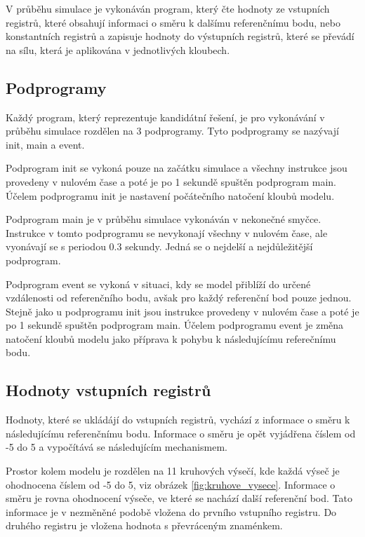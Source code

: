 V průběhu simulace je vykonáván program, který čte hodnoty ze vstupních registrů, které obsahují informaci o směru k dalšímu referenčnímu bodu, nebo konstantních registrů a zapisuje hodnoty do výstupních registrů, které se převádí na sílu, která je aplikována v jednotlivých kloubech.

\subsection{Podprogramy}
Každý program, který reprezentuje kandidátní řešení, je pro vykonávání v průběhu simulace rozdělen na 3 podprogramy.
Tyto podprogramy se nazývají init, main a event.

Podprogram init se vykoná pouze na začátku simulace a všechny instrukce jsou provedeny v nulovém čase a poté je po 1 sekundě spuštěn podprogram main.
Účelem podprogramu init je nastavení počátečního natočení kloubů modelu.

Podprogram main je v průběhu simulace vykonáván v nekonečné smyčce.
Instrukce v tomto podprogramu se nevykonají všechny v nulovém čase, ale vyonávají se s periodou 0.3 sekundy.
Jedná se o nejdelší a nejdůležitější podprogram.

Podprogram event se vykoná v situaci, kdy se model přiblíží do určené vzdálenosti od referenčního bodu, avšak pro každý referenční bod pouze jednou.
Stejně jako u podprogramu init jsou instrukce provedeny v nulovém čase a poté je po 1 sekundě spuštěn podprogram main.
Účelem podprogramu event je změna natočení kloubů modelu jako příprava k pohybu k následujícímu referečnímu bodu.

\subsection{Hodnoty vstupních registrů}
Hodnoty, které se ukládájí do vstupních registrů, vychází z informace o směru k následujícímu referenčnímu bodu.
Informace o směru je opět vyjádřena číslem od -5 do 5 a vypočítává se následujícím mechanismem.

Prostor kolem modelu je rozdělen na 11 kruhových výsečí, kde každá výseč je ohodnocena číslem od -5 do 5, viz obrázek \ref{fig:kruhove_vysece}.
Informace o směru je rovna ohodnocení výseče, ve které se nachází další referenční bod.
Tato informace je v nezměněné podobě vložena do prvního vstupního registru.
Do druhého registru je vložena hodnota s převráceným znaménkem.

